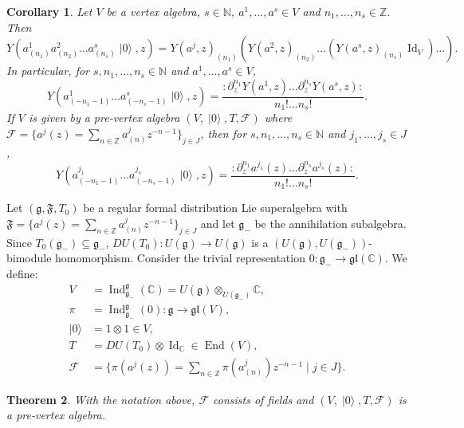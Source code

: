 \documentclass[a4paper, 12pt, reqno]{amsart}
\newtheorem{theorem}{Theorem}[subsection]
\newtheorem{corollary}[theorem]{Corollary}
\theoremstyle{remark}
\numberwithin{equation}{subsection}
\DeclareMathOperator{\Id}{Id}
\DeclareMathOperator{\End}{End}
\DeclareMathOperator{\Ind}{Ind}
\DeclareMathOperator{\vac}{|0\rangle}
\begin{document}
\begin{corollary}
  \label{crl:1}
  Let $V$ be a vertex algebra, $s \in \mathbb{N}$, $a^1, \dots, a^s \in V$ and $n_1, \dots, n_s \in \mathbb{Z}$.
  Then 
  \begin{equation*}
    Y(a^1_{(n_1)}a^2_{(n_2)}\dots a^s_{(n_s)}\vac, z) = Y(a^j, z)_{(n_1)}(Y(a^2, z)_{(n_2)}\dots (Y(a^s, z)_{(n_s)}\Id_V)\dots).
  \end{equation*}
  In particular, for $s, n_1, \dots, n_s \in \mathbb{N}$ and $a^1, \dots, a^s \in V$,
  \begin{equation*}
    Y(a^1_{(-n_1 - 1)}\dots a^s_{(-n_s - 1)}\vac, z) = \frac{:\partial^{n_1}_zY(a^1,z)\dots \partial^{n_s}_zY(a^s,z):}{n_1!\dots n_s!}.
  \end{equation*}
  If $V$ is given by a pre-vertex algebra $(V, \vac, T, \mathcal{F})$ where $\mathcal{F} = \{a^j(z) = \sum_{n \in \mathbb{Z}}a^j_{(n)}z^{-n - 1}\}_{j \in J}$, then for $s, n_1, \dots, n_s \in \mathbb{N}$ and $j_1, \dots, j_s \in J$,
  \begin{equation*}
    Y(a^{j_1}_{(-n_1 - 1)}\dots a^{j_s}_{(-n_s - 1)}\vac, z) = \frac{:\partial^{n_1}_za^{j_1}(z)\dots \partial^{n_s}_za^{j_s}(z):}{n_1!\dots n_s!}.
  \end{equation*}
\end{corollary}

Let $(\mathfrak{g}, \mathfrak{F}, T_0)$ be a regular formal distribution Lie superalgebra with $\mathfrak{F} = \{a^j(z) = \sum_{n \in \mathbb{Z}}a^j_{(n)}z^{-n - 1}\}_{j \in J}$ and let $\mathfrak{g}_-$ be the annihilation subalgebra.
Since $T_0(\mathfrak{g}_-) \subseteq \mathfrak{g}_-$, $DU(T_0): U(\mathfrak{g}) \to U(\mathfrak{g})$ is a $(U(\mathfrak{g}), U(\mathfrak{g}_-))$-bimodule homomorphism.
Consider the trivial representation $0: \mathfrak{g}_- \to \mathfrak{gl}(\mathbb{C})$.
We define:
\begin{align*}
  V &= \Ind^{\mathfrak{g}}_{\mathfrak{g}_-}(\mathbb{C}) = U(\mathfrak{g}) \otimes_{U(\mathfrak{g}_-)} \mathbb{C}, \\
  \pi &= \Ind^{\mathfrak{g}}_{\mathfrak{g}_-}(0): \mathfrak{g} \to \mathfrak{gl}(V), \\
  \vac &= 1\otimes1 \in V, \\
  T &= DU(T_0) \otimes \Id_{\mathbb{C}} \in \End(V), \\
  \mathcal{F} &= \{\pi(a^j(z)) = \sum_{n \in \mathbb{Z}}\pi(a^j_{(n)})z^{-n - 1} \mid j \in J\}.
\end{align*}

\begin{theorem}
  \label{thr:16}
  With the notation above, $\mathcal{F}$ consists of fields and $(V, \vac, T, \mathcal{F})$ is a pre-vertex algebra.
\end{theorem}
\end{document}
